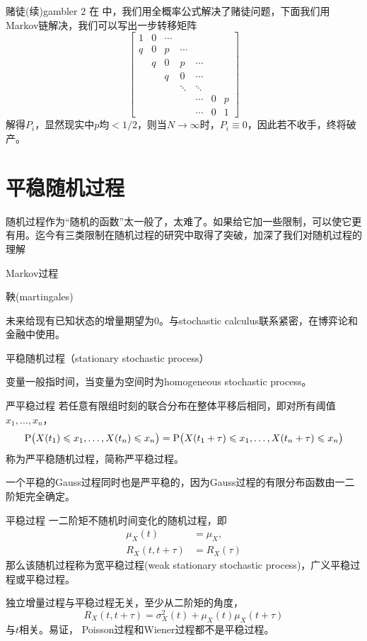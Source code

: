 \begin{example}{赌徒(续)}{gambler 2}
	在 中，我们用全概率公式解决了赌徒问题，下面我们用Markov链解决，我们可以写出一步转移矩阵
	\[
		\begin{bmatrix}
			1&0&\cdots\\
			q&0&p&\cdots\\
			&q&0&p&\cdots\\
			&&q&0&\cdots\\
			&&&\ddots&\ddots\\
			&&&&\cdots&0&p\\
			&&&&\cdots&0&1
		\end{bmatrix}
	\]
	解得$P_i$，显然现实中$p$均$< 1/2$，则当$N \to \infty$时，$P_i \equiv 0$，因此若不收手，终将破产。
\end{example}
\section{平稳随机过程}
随机过程作为“随机的函数”太一般了，太难了。如果给它加一些限制，可以使它更有用。迄今有三类限制在随机过程的研究中取得了突破，加深了我们对随机过程的理解
\begin{compactitem}
	\item Markov过程
	\item 鞅(martingales)
	
	未来给现有已知状态的增量期望为0。与stochastic calculus联系紧密，在博弈论和金融中使用。
	\item 平稳随机过程（stationary stochastic process）
	
	变量一般指时间，当变量为空间时为homogeneous stochastic process。
\end{compactitem}
\begin{definition}{严平稳过程}{}
	若任意有限组时刻的联合分布在整体平移后相同，即对所有阈值$x_1,\ldots,x_n$，
	\begin{equation}\label{eq:ps-strict-stationarity}
		\operatorname{P}\bigl(X(t_1) \leqslant x_1,\ldots,X(t_n) \leqslant x_n\bigr) = \operatorname{P}\bigl(X(t_1 + \tau) \leqslant x_1,\ldots,X(t_n + \tau) \leqslant x_n\bigr)
	\end{equation}
	称为严平稳随机过程，简称严平稳过程。
\end{definition}
一个平稳的Gauss过程同时也是严平稳的，因为Gauss过程的有限分布函数由一二阶矩完全确定。
\begin{definition}{平稳过程}{}
	一二阶矩不随机时间变化的随机过程，即
	\begin{subequations}
		\begin{align}
			\mu_X(t) &= \mu_X,\\
			R_X(t,t + \tau) &= R_X(\tau)
		\end{align}
	\end{subequations}
	那么该随机过程称为宽平稳过程(weak stationary stochastic process)，广义平稳过程或平稳过程。
\end{definition}
独立增量过程与平稳过程无关，至少从二阶矩的角度，
\[
	R_X(t,t + \tau) = \sigma^2_X(t) + \mu_X(t)\mu_X(t + \tau)
\]
与$t$相关。易证，
Poisson过程和Wiener过程都不是平稳过程。

